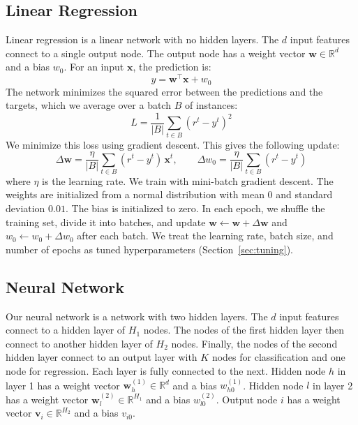\documentclass[twoside,11pt]{article}
\begin{document}
\subsection{Linear Regression}
Linear regression is a linear network with no hidden layers. The $d$ input features connect to a single output node. The output node has a weight vector $\mathbf{w} \in \mathbb{R}^{d}$ and a bias $w_0$. For an input $\mathbf{x}$, the prediction is:
\begin{equation}
    y = \mathbf{w}^{\top}\mathbf{x} + w_0
\end{equation}
The network minimizes the squared error between the predictions and the targets, which we average over a batch $B$ of instances:
\begin{equation}
    L = \frac{1}{|B|}\sum_{t \in B}(r^t - y^t)^2
\end{equation}
We minimize this loss using gradient descent. This gives the following update:
\begin{equation}
    \Delta\mathbf{w} = \frac{\eta}{|B|}\sum_{t \in B}(r^t - y^t)\,\mathbf{x}^t, \qquad
    \Delta w_0 = \frac{\eta}{|B|}\sum_{t \in B}(r^t - y^t)
\end{equation}
where $\eta$ is the learning rate. We train with mini-batch gradient descent. The weights are initialized from a normal distribution with mean $0$ and standard deviation $0.01$. The bias is initialized to zero. In each epoch, we shuffle the training set, divide it into batches, and update $\mathbf{w} \leftarrow \mathbf{w} + \Delta\mathbf{w}$ and $w_{0} \leftarrow w_{0} + \Delta w_{0}$ after each batch. We treat the learning rate, batch size, and number of epochs as tuned hyperparameters (Section~\ref{sec:tuning}).

\subsection{Neural Network}
Our neural network is a network with two hidden layers. The $d$ input features connect to a hidden layer of $H_1$ nodes. The nodes of the first hidden layer then connect to another hidden layer of $H_2$ nodes. Finally, the nodes of the second hidden layer connect to an output layer with $K$ nodes for classification and one node for regression. Each layer is fully connected to the next. Hidden node $h$ in layer 1 has a weight vector $\mathbf{w}^{(1)}_h \in \mathbb{R}^{d}$ and a bias $w^{(1)}_{h0}$. Hidden node $l$ in layer 2 has a weight vector $\mathbf{w}^{(2)}_l \in \mathbb{R}^{H_1}$ and a bias $w^{(2)}_{l0}$. Output node $i$ has a weight vector $\mathbf{v}_i \in \mathbb{R}^{H_2}$ and a bias $v_{i0}$.
\end{document}
